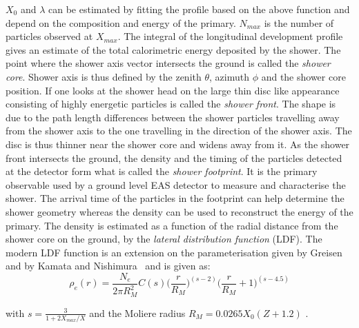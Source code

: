 $X_0$ and $\lambda$ can be estimated by fitting the profile based on the above function and depend on the composition and energy of the primary. $N_{max}$ is the number of particles observed at $X_{max}$. The integral of the longitudinal development profile gives an estimate of the total calorimetric energy deposited by the shower. 
The point where the shower axis vector intersects the ground is called the \textit{shower core}. Shower axis is thus defined by the zenith $\theta$, azimuth $\phi$ and the shower core position. If one looks at the shower head on the large thin disc like appearance consisting of highly energetic particles is called the \textit{shower front}. The shape is due to the path length differences between the shower particles travelling away from the shower axis to the one travelling in the direction of the shower axis. The disc is thus thinner near the shower core and widens away from it. As the shower front intersects the ground, the density and the timing of the particles detected at the detector form what is called the \textit{shower footprint}. It is the primary observable used by a ground level EAS detector to measure and characterise the shower. The arrival time of the particles in the footprint can help determine the shower geometry whereas the density can be used to reconstruct the energy of the primary. The density is estimated as a function of the radial distance from the shower core on the ground, by the \textit{lateral distribution function} (LDF). The modern LDF function is an extension on the parameterisation given by Greisen~\cite{annurev:/content/journals/10.1146/annurev.ns.10.120160.000431} and by Kamata and Nishimura~\cite{10.1143/PTPS.6.93} and is given as:
\begin{equation}
    \rho_e(r) = \frac{N_e}{2 \pi R_M^2} C(s) \biggl(\frac{r}{R_M}\biggr)^{(s-2)}\biggl(\frac{r}{R_M}+1\biggr)^{(s-4.5)}
\end{equation}

with $s = \frac{3}{1+2 X_{max}/X}$ and the Moliere radius $R_M = 0.0265 X_0(Z + 1.2)$ . 


